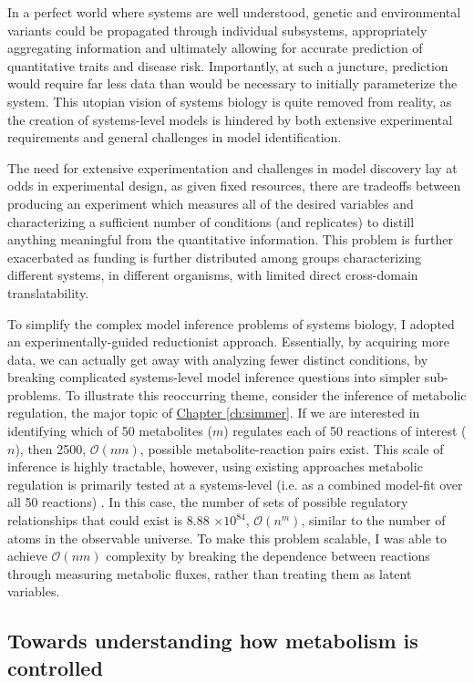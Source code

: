 In a perfect world where systems are well understood, genetic and environmental variants could be propagated through individual subsystems, appropriately aggregating information and ultimately allowing for accurate prediction of quantitative traits and disease risk.  Importantly, at such a juncture, prediction would require far less data than would be necessary to initially parameterize the system. This utopian vision of systems biology is quite removed from reality, as the creation of systems-level models is hindered by both extensive experimental requirements and general challenges in model identification.

The need for extensive experimentation and challenges in model discovery lay at odds in experimental design, as given fixed resources, there are tradeoffs between producing an experiment which measures all of the desired variables and characterizing a sufficient number of conditions (and replicates) to distill anything meaningful from the quantitative information. This problem is further exacerbated as funding is further distributed among groups characterizing different systems, in different organisms, with limited direct cross-domain translatability. 

To simplify the complex model inference problems of systems biology, I adopted an experimentally-guided reductionist approach. Essentially, by acquiring more data, we can actually get away with analyzing fewer distinct conditions, by breaking complicated systems-level model inference questions into simpler sub-problems. To illustrate this reoccurring theme, consider the inference of metabolic regulation, the major topic of \hyperref[ch:simmer]{Chapter \ref{ch:simmer}}. If we are interested in identifying which of 50 metabolites ($m$) regulates each of 50 reactions of interest ($n$), then 2500, $\mathcal{O}(nm)$, possible metabolite-reaction pairs exist. This scale of inference is highly tractable, however, using existing approaches metabolic regulation is primarily tested at a systems-level (i.e. as a combined model-fit over all 50 reactions) \cite{Link:2013dj, Zampar:2013fr}.  In this case, the number of sets of possible regulatory relationships that could exist is 8.88 $\times 10^{84}$, $\mathcal{O}(n^{m})$, similar to the number of atoms in the observable universe. To make this problem scalable, I was able to achieve $\mathcal{O}(nm)$ complexity by breaking the dependence between reactions through measuring metabolic fluxes, rather than treating them as latent variables.

\subsection{Towards understanding how metabolism is controlled}

